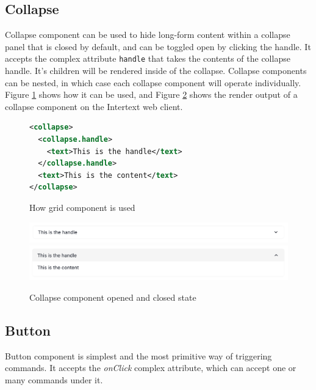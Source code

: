 \subsection{Collapse}

Collapse component can be used to hide long-form content within a collapse panel that is closed by default, and can be toggled open by clicking the handle. It accepts the complex attribute \texttt{handle} that takes the contents of the collapse handle. It's children will be rendered inside of the collapse. Collapse components can be nested, in which case each collapse component will operate individually. Figure \ref{fig:collapse_xml} shows how it can be used, and Figure \ref{fig:collapse} shows the render output of a collapse component on the Intertext web client.

\begin{figure}
\begin{minipage}{\linewidth}
\begin{lstlisting}[language=xml]
<collapse>
  <collapse.handle>
    <text>This is the handle</text>
  </collapse.handle>
  <text>This is the content</text>
</collapse>
\end{lstlisting}
\end{minipage}
\caption{How grid component is used}%
\label{fig:collapse_xml}%
\end{figure}

\begin{figure}
  \centering
  \includegraphics[width=13cm]{thesis/paper/images/collapse_closed.png}
  \includegraphics[width=13cm]{thesis/paper/images/collapse_open.png}
  \caption{Collapse component opened and closed state}%
  \label{fig:collapse}%
\end{figure}

\subsection{Button}

Button component is simplest and the most primitive way of triggering commands. It accepts the \textit{onClick} complex attribute, which can accept one or many commands under it.

